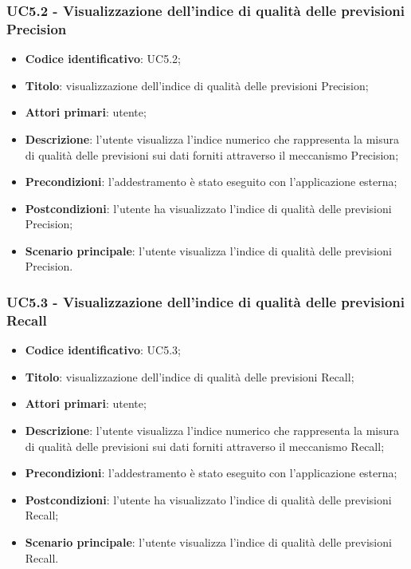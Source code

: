 \subsubsection{UC5.2 - Visualizzazione dell'indice di qualità delle previsioni Precision}
\begin{itemize}
	\item \textbf{Codice identificativo}: UC5.2;
	\item \textbf{Titolo}: visualizzazione dell'indice di qualità delle previsioni Precision\glo;
	\item \textbf{Attori primari}: utente;
	\item \textbf{Descrizione}: l'utente visualizza l'indice numerico che rappresenta la misura di qualità delle previsioni sui dati forniti attraverso il meccanismo Precision\glo;
	\item \textbf{Precondizioni}: l'addestramento è stato eseguito con l'applicazione esterna;
	\item \textbf{Postcondizioni}: l'utente ha visualizzato l'indice di qualità delle previsioni Precision\glo;
	\item \textbf{Scenario principale}: l'utente visualizza l'indice di qualità delle previsioni Precision\glo.
\end{itemize} 
\subsubsection{UC5.3 - Visualizzazione dell'indice di qualità delle previsioni Recall}
\begin{itemize}
	\item \textbf{Codice identificativo}: UC5.3;
	\item \textbf{Titolo}: visualizzazione dell'indice di qualità delle previsioni Recall\glo;
	\item \textbf{Attori primari}: utente;
	\item \textbf{Descrizione}: l'utente visualizza l'indice numerico che rappresenta la misura di qualità delle previsioni sui dati forniti attraverso il meccanismo Recall\glo;
	\item \textbf{Precondizioni}: l'addestramento è stato eseguito con l'applicazione esterna;
	\item \textbf{Postcondizioni}: l'utente ha visualizzato l'indice di qualità delle previsioni Recall\glo;
	\item \textbf{Scenario principale}: l'utente visualizza l'indice di qualità delle previsioni Recall\glo.
\end{itemize} 
